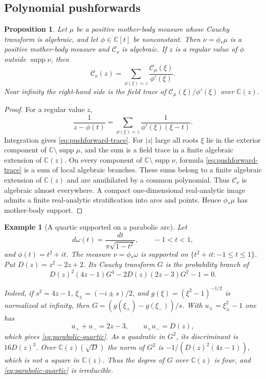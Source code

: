 \documentclass[10pt,a4paper]{amsart}
\newtheorem{proposition}[theorem]{Proposition}
\newtheorem{example}[theorem]{Example}
\newcommand{\bC}{\mathbb C}
\newcommand{\Cauchy}{\mathcal C}
\newcommand{\supp}{\operatorname{supp}}
\begin{document}
\subsection{Polynomial pushforwards}

\begin{proposition}\label{prop:pushforward}
Let $\mu$ be a positive mother-body measure whose Cauchy transform is algebraic,
and let $\phi\in\bC[t]$ be nonconstant.  Then $\nu=\phi_*\mu$ is a positive
mother-body measure and $\Cauchy_\nu$ is algebraic.  If $z$ is a regular value of
$\phi$ outside $\supp\nu$, then
\begin{equation}\label{eq:pushforward-trace}
 \Cauchy_\nu(z)=
 \sum_{\phi(\xi)=z}\frac{\Cauchy_\mu(\xi)}{\phi'(\xi)}.
\end{equation}
Near infinity the right-hand side is the field trace of
$\Cauchy_\mu(\xi)/\phi'(\xi)$ over $\bC(z)$.
\end{proposition}

\begin{proof}
For a regular value $z$,
\[
 \frac1{z-\phi(t)}=
 \sum_{\phi(\xi)=z}\frac1{\phi'(\xi)(\xi-t)}.
\]
Integration gives \eqref{eq:pushforward-trace}.  For $|z|$ large all roots $\xi$ lie in the exterior component of
$\bC\setminus\supp\mu$, and the sum is a field trace in a finite algebraic
extension of $\bC(z)$.  On every component of $\bC\setminus\supp\nu$, formula
\eqref{eq:pushforward-trace} is a sum of local algebraic branches.  These sums
belong to a finite algebraic extension of $\bC(z)$ and are annihilated by a
common polynomial.  Thus $\Cauchy_\nu$ is algebraic almost everywhere.  A compact
one-dimensional real-analytic image admits a finite real-analytic
stratification into arcs and points.  Hence $\phi_*\mu$ has mother-body
support.
\end{proof}

\begin{example}[A quartic supported on a parabolic arc]
\label{ex:parabolic-pushforward}
Let
\[
 d\omega(t)=\frac{dt}{\pi\sqrt{1-t^2}},\qquad -1<t<1,
\]
and $\phi(t)=t^2+it$.  The measure $\nu=\phi_*\omega$ is supported on
$\{t^2+it:-1\le t\le1\}$.  Put $D(z)=z^2-2z+2$.  Its Cauchy transform $G$ is the
probability branch of
\begin{equation}\label{eq:parabolic-quartic}
 D(z)^2(4z-1)G^4-2D(z)(2z-3)G^2-1=0.
\end{equation}

Indeed, if $s^2=4z-1$, $\xi_\pm=(-i\pm s)/2$, and
$g(\xi)=(\xi^2-1)^{-1/2}$ is normalized at infinity, then
$G=(g(\xi_+)-g(\xi_-))/s$.  With $u_\pm=\xi_\pm^2-1$ one has
\[
 u_++u_-=2z-3,
 \qquad u_+u_-=D(z),
\]
which gives \eqref{eq:parabolic-quartic}.  As a quadratic in $G^2$, its
discriminant is $16D(z)^3$.  Over $\bC(z)(\sqrt D)$ the norm of $G^2$ is
$-1/(D(z)^2(4z-1))$, which is not a square in $\bC(z)$.  Thus the degree of $G$
over $\bC(z)$ is four, and \eqref{eq:parabolic-quartic} is irreducible.
\end{example}
\end{document}
